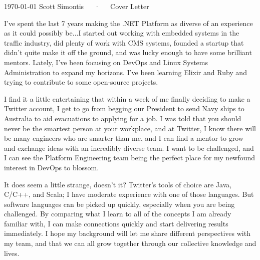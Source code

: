 \documentclass[11pt, letterpaper]{awesome-cv}
\begin{document}
\makecvheader

\makecvfooter
  {\today}
  {Scott Simontis~~~·~~~Cover Letter}
  {}

\makelettertitle

\begin{cvletter}

I've spent the last 7 years making the .NET Platform as diverse of an experience as it could possibly be...I started out working with embedded systems in the traffic industry, did plenty of work with CMS systems, founded a startup that didn't quite make it off the ground, and was lucky enough to have some brilliant mentors. Lately, I've been focusing on DevOps and Linux Systems Administration to expand my horizons. I've been learning Elixir and Ruby and trying to contribute to some open-source projects.

I find it a little entertaining that within a week of me finally deciding to make a Twitter account, I get to go from begging our President to send Navy ships to Australia to aid evacuations to applying for a job. I was told that you should never be the smartest person at your workplace, and at Twitter, I know there will be many engineers who are smarter than me, and I can find a mentor to grow and exchange ideas with an incredibly diverse team. I want to be challenged, and I can see the Platform Engineering team being the perfect place for my newfound interest in DevOps to blossom.

It does seem a little strange, doesn't it? Twitter's tools of choice are Java, C/C++, and Scala; I have moderate experience with one of those languages. But software languages can be picked up quickly, especially when you are being challenged. By comparing what I learn to all of the concepts I am already familiar with, I can make connections quickly and start delivering results immediately. I hope my background will let me share different perspectives with my team, and that we can all grow together through our collective knowledge and lives.

\end{cvletter}


\makeletterclosing
\end{document}
